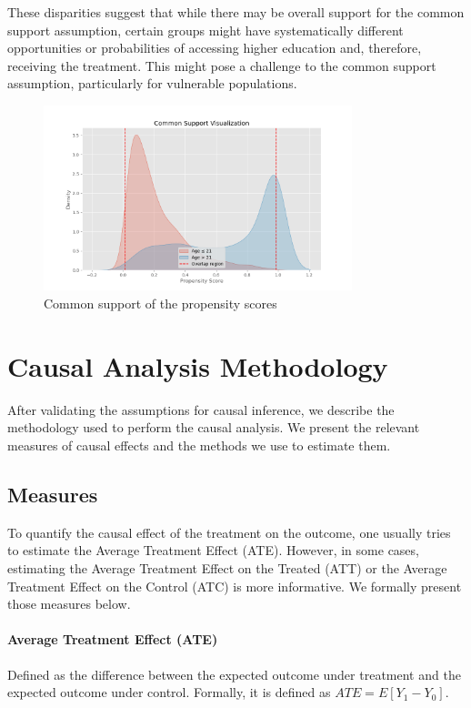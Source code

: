 \documentclass{article}
\begin{document}
These disparities suggest that while there may be overall support for the common support assumption, certain groups might have systematically different opportunities or probabilities of accessing higher education and, therefore, receiving the treatment. This might pose a challenge to the common support assumption, particularly for vulnerable populations.


\begin{figure}
    \centering
    \caption{Common support of the propensity scores}
    \label{fig:common_support}
    \includegraphics[width = 0.8\textwidth]{plots/common_support.png}
\end{figure}



\section{Causal Analysis Methodology}

After validating the assumptions for causal inference, we describe the methodology used to perform the causal analysis. We present the relevant measures of causal effects and the methods we use to estimate them.

\subsection{Measures}

To quantify the causal effect of the treatment on the outcome, one usually tries to estimate the Average Treatment Effect (ATE). However, in some cases, estimating the Average Treatment Effect on the Treated (ATT) or the Average Treatment Effect on the Control (ATC) is more informative. We formally present those measures below.

\paragraph{Average Treatment Effect (ATE)} Defined as the difference between the expected outcome under treatment and the expected outcome under control. Formally, it is defined as $ATE = E[Y_1 - Y_0]$.
\end{document}
